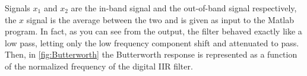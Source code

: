 Signals $x_{1}$ and $x_{2}$ are the in-band signal and the out-of-band signal respectively, the $x$ signal is the average between the two and is given as input to the Matlab program. In fact, as you can see from the output, the filter behaved exactly like a low pass, letting only the low frequency component shift and attenuated to pass.
Then, in \autoref{fig:Butterworth} the Butterworth response is represented as a function of the normalized frequency of the digital IIR filter.